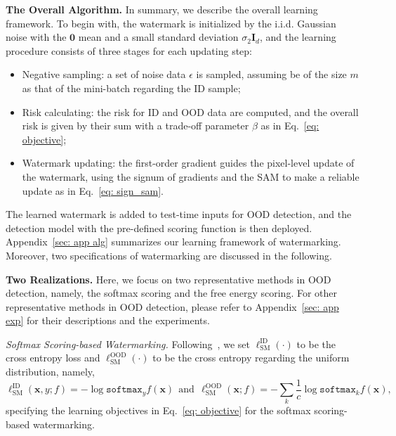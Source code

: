 \documentclass{article}
\begin{document}
\textbf{The Overall Algorithm.} In summary, we describe the overall learning framework. To begin with, the watermark is initialized by the i.i.d. Gaussian noise with the $\boldsymbol{0}$ mean and a small standard deviation $\sigma_2\mathbf{I}_d$, and the learning procedure consists of three stages for each updating step:
\begin{itemize}
    \item Negative sampling: a set of noise data $\epsilon$ is sampled, assuming be of the size $m$ as that of the mini-batch regarding the ID sample;
\item Risk calculating: the risk for ID and OOD data are computed, and the overall risk is given by their sum with a trade-off parameter $\beta$ as in Eq.~\eqref{eq: objective};
\item Watermark updating: the first-order gradient guides the pixel-level update of the watermark, using the signum of gradients and the SAM to make a reliable update as in Eq.~\eqref{eq: sign_sam}. 
\end{itemize}

The learned watermark is added to test-time inputs for OOD detection, and the detection model with the pre-defined scoring function is then deployed. Appendix~\ref{sec: app alg} summarizes our learning framework of watermarking. Moreover, two specifications of watermarking are discussed in the following.










\textbf{Two Realizations.}
Here, we focus on two representative methods in OOD detection, namely, the softmax scoring and the free energy scoring. {For other representative methods in OOD detection, please refer to Appendix~\ref{sec: app exp} for their descriptions and the experiments.}  

\textit{Softmax Scoring-based Watermarking.} Following~\cite{HendrycksMD19}, we set $\ell^\text{ID}_\text{SM}(\cdot)$ to be the cross entropy loss and  $\ell^\text{OOD}_\text{SM}(\cdot)$ to be the cross entropy regarding the uniform distribution, namely,
\begin{equation}
    \ell^\text{ID}_\text{SM}(\boldsymbol{x},y;f)=-\log \texttt{softmax}_y f(\boldsymbol{x})~~\text{and}~~\ell^\text{OOD}_\text{SM}(\boldsymbol{x};f)=-\sum_k \frac{1}{c} \log \texttt{softmax}_k f(\boldsymbol{x}), \label{eq:obj_sm}
\end{equation}
specifying the learning objectives in Eq.~\eqref{eq: objective} for the softmax scoring-based watermarking. 
\end{document}
